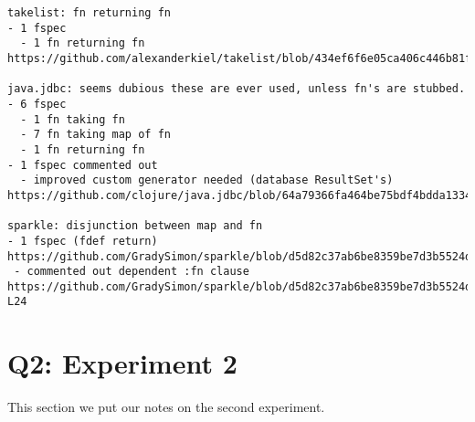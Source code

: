 \begin{verbatim}
takelist: fn returning fn
- 1 fspec
  - 1 fn returning fn
https://github.com/alexanderkiel/takelist/blob/434ef6f6e05ca406c446b81fa5a77c7f0519c355/src/takelist/app.clj#L27

java.jdbc: seems dubious these are ever used, unless fn's are stubbed.
- 6 fspec
  - 1 fn taking fn
  - 7 fn taking map of fn
  - 1 fn returning fn
- 1 fspec commented out
  - improved custom generator needed (database ResultSet's)
https://github.com/clojure/java.jdbc/blob/64a79366fa464be75bdf4bdda133441b9d1efb26/src/main/clojure/clojure/java/jdbc/spec.clj#L124

sparkle: disjunction between map and fn
- 1 fspec (fdef return)
https://github.com/GradySimon/sparkle/blob/d5d82c37ab6be8359be7d3b5524d8b32dac452a1/src/sparkle/layer.clj#L9
 - commented out dependent :fn clause
https://github.com/GradySimon/sparkle/blob/d5d82c37ab6be8359be7d3b5524d8b32dac452a1/src/sparkle/spec.clj#L18-L24
\end{verbatim}
\endgroup

\section{Q2: Experiment 2}
\label{appendix2}

This section we put our notes on the second experiment.

